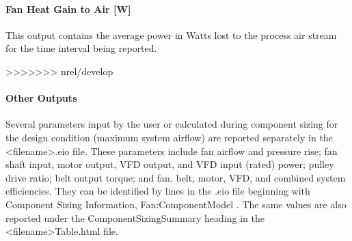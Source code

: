 \paragraph{Fan Heat Gain to Air {[}W{]}}\label{fan-heat-gain-to-air-w-4}

This output contains the average power in Watts lost to the process air stream for the time interval being reported.

>>>>>>> nrel/develop
\paragraph{Other Outputs}\label{other-outputs}

Several parameters input by the user or calculated during component sizing for the design condition (maximum system airflow) are reported separately in the \textless{}filename\textgreater{}.eio file. These parameters include fan airflow and pressure rise; fan shaft input, motor output, VFD output, and VFD input (rated) power; pulley drive ratio; belt output torque; and fan, belt, motor, VFD, and combined system efficiencies. They can be identified by lines in the .eio file beginning with Component Sizing Information, Fan:ComponentModel . The same values are also reported under the ComponentSizingSummary heading in the \textless{}filename\textgreater{}Table.html file.
